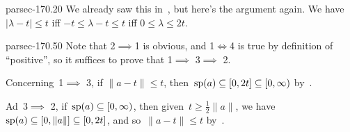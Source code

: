 \documentclass[b5page]{book}
\begin{document}
\begin{solution}{parsec-170.20}
    We already saw this in~,
    but here's the argument again.
We have $\left|\lambda - t\right| \leq t$
iff $-t\leq \lambda - t\leq t$
iff $0\leq \lambda \leq 2t$.
\end{solution}
\begin{solution}{parsec-170.50}
    Note that
2$\implies$1 is obvious, and
1$\iff$4 is true by definition of ``positive'',
so it suffices to prove 
that 1$\implies$ 3$\implies$ 2.

Concerning~1$\implies$ 3, if
$\|a-t\|\leq t$,
    then~$\mathrm{sp}(a)\subseteq [0,2t]\subseteq [0,\infty)$
    by~.

Ad~3$\implies$ 2,
    if~$\mathrm{sp}(a)\subseteq [0,\infty)$,
    then given~$t\geq \frac{1}{2}\|a\|$,
    we have $\mathrm{sp}(a)\subseteq [0,\|a\|]\subseteq [0,2t]$,
    and so~$\|a-t\|\leq t$ by~.
\end{solution}
\end{document}
